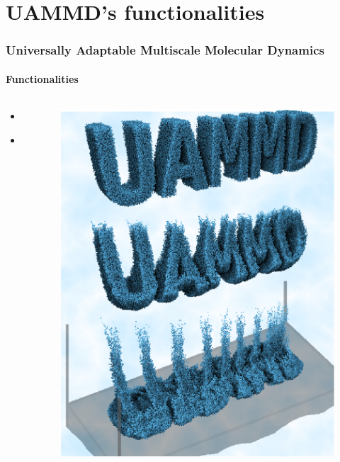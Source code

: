 \documentclass{beamer}
\begin{document}
\begin{frame}
\begin{columns}
\begin{column}{0.45\linewidth}
\begin{itemize}
      \end{itemize}
    \end{column}
  \end{columns}
\end{frame}

\section{UAMMD's functionalities}
\begin{frame}
  \frametitle{Universally Adaptable Multiscale Molecular Dynamics}
  \framesubtitle{Functionalities}
  \begin{columns}
    \begin{column}{0.5\linewidth}
      \begin{itemize}
      \item a
      \item b
      \end{itemize}
    \end{column}
    \begin{column}{0.5\linewidth}
      \begin{figure}
        \centering
        \includegraphics[height=0.75\textheight]{poster.png}

\end{figure}
\end{column}
\end{columns}
\end{frame}
\end{document}
